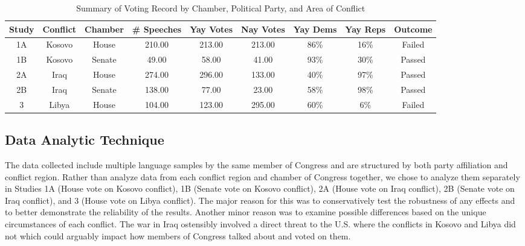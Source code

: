 \documentclass[english,,man]{apa6}
\begin{document}
\begin{table}[tbp]

\begin{center}
\begin{threeparttable}

\caption{\label{tab:summary-table}Summary of Voting Record by Chamber, Political Party, and Area of Conflict}

\small{

\begin{tabular}{ccccccccc}
\toprule
Study & Conflict & Chamber & \# Speeches & Yay Votes & Nay Votes & Yay Dems & Yay Reps & Outcome\\
\midrule
1A & Kosovo & House & 210.00 & 213.00 & 213.00 & 86\% & 16\% & Failed\\
1B & Kosovo & Senate & 49.00 & 58.00 & 41.00 & 93\% & 30\% & Passed\\
2A & Iraq & House & 274.00 & 296.00 & 133.00 & 40\% & 97\% & Passed\\
2B & Iraq & Senate & 138.00 & 77.00 & 23.00 & 58\% & 98\% & Passed\\
3 & Libya & House & 104.00 & 123.00 & 295.00 & 60\% & 6\% & Failed\\
\bottomrule
\end{tabular}

}

\end{threeparttable}
\end{center}

\end{table}

\hypertarget{data-analytic-technique}{%
\subsection{Data Analytic Technique}\label{data-analytic-technique}}

The data collected include multiple language samples by the same member of Congress and are structured by both party affiliation and conflict region. Rather than analyze data from each conflict region and chamber of Congress together, we chose to analyze them separately in Studies 1A (House vote on Kosovo conflict), 1B (Senate vote on Kosovo conflict), 2A (House vote on Iraq conflict), 2B (Senate vote on Iraq conflict), and 3 (House vote on Libya conflict). The major reason for this was to conservatively test the robustness of any effects and to better demonstrate the reliability of the results. Another minor reason was to examine possible differences based on the unique circumstances of each conflict. The war in Iraq ostensibly involved a direct threat to the U.S. where the conflicts in Kosovo and Libya did not which could arguably impact how members of Congress talked about and voted on them.
\end{document}
